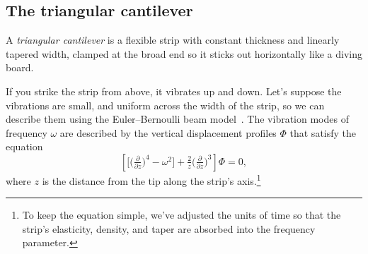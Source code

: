 \documentclass{article}
\theoremstyle{definition}
\theoremstyle{plain}
\begin{document}
{\subsection{The triangular cantilever}\label{sec:catilever}
A {\em triangular cantilever} is a flexible strip with constant thickness and linearly tapered width, clamped at the broad end so it sticks out horizontally like a diving board.
\begin{center}
\end{center}
If you strike the strip from above, it vibrates up and down. Let's suppose the vibrations are small, and uniform across the width of the strip, so we can describe them using the Euler--Bernoulli beam model~\cite[\S 12.4]{genta2009vibration}. The vibration modes of frequency $\omega$ are described by the vertical displacement profiles $\Phi$ that satisfy the equation
\begin{equation}\label{eqn:triangular_cantilever}
    \left[\big[\big(\tfrac{\partial}{\partial z}\big)^4 - \omega^2\big] + \tfrac{2}{z}\big(\tfrac{\partial}{\partial z}\big)^3\right] \Phi = 0,
\end{equation}
where $z$ is the distance from the tip along the strip's axis.\footnote{To keep the equation simple, we've adjusted the units of time so that the strip's elasticity, density, and taper are absorbed into the frequency parameter.}

}
\end{document}
